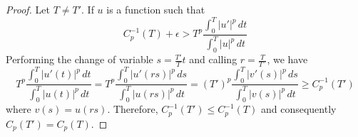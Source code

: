 \documentclass[twoside]{article}
\theoremstyle{remark}
\renewcommand{\leq}{\leqslant}
\renewcommand{\geq}{\geqslant}
\begin{document}
\begin{proof}
Let $T\neq T'$. If $u$  is a function such that 
\begin{equation}
C_p^{-1}(T)+\epsilon> T^p \frac{\int_0^T |u'|^p\,dt}{\int_0^T |u|^p\,dt}
\end{equation}  
Performing the change of variable $s=\frac{T'}{T}t$ and calling $r=\frac{T}{T´}$, we have
\begin{equation}
T^p \frac{\int_0^T |u'(t)|^p\,dt}{\int_0^T |u(t)|^p\,dt}=
T^p \frac{\int_0^T |u'(rs)|^p\,ds}{\int_0^T |u(rs)|^p\,dt}=
(T')^p \frac{\int_0^T |v'(s)|^p\,ds}{\int_0^T |v(s)|^p\,dt}\geq C_p^{-1}(T')
\end{equation}
where $v(s)=u(rs)$. Therefore, $C_p^{-1}(T')\leq C_p^{-1}(T)$ and consequently $C_p(T')=C_p(T)$.
\end{proof}
\end{document}

